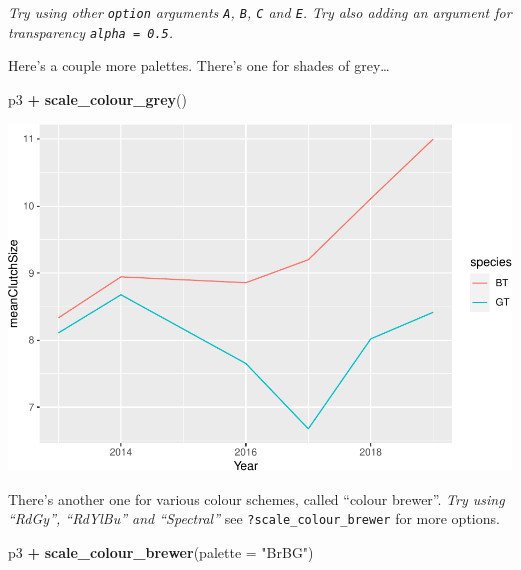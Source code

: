 \documentclass[
  a4paperpaper,
]{book}
\newenvironment{Shaded}{\begin{snugshade}}{\end{snugshade}}
\newcommand{\DataTypeTok}[1]{\textcolor[rgb]{0.13,0.29,0.53}{#1}}
\newcommand{\KeywordTok}[1]{\textcolor[rgb]{0.13,0.29,0.53}{\textbf{#1}}}
\newcommand{\NormalTok}[1]{#1}
\newcommand{\OperatorTok}[1]{\textcolor[rgb]{0.81,0.36,0.00}{\textbf{#1}}}
\newcommand{\StringTok}[1]{\textcolor[rgb]{0.31,0.60,0.02}{#1}}
\begin{document}
\emph{Try using other \texttt{option} arguments \texttt{A}, \texttt{B}, \texttt{C} and \texttt{E}. Try also adding an argument for transparency \texttt{alpha\ =\ 0.5}.}

Here's a couple more palettes. There's one for shades of grey\ldots{}

\begin{Shaded}
\begin{Highlighting}[]
\NormalTok{p3 }\OperatorTok{+}\StringTok{ }
\StringTok{  }\KeywordTok{scale\_colour\_grey}\NormalTok{()}
\end{Highlighting}
\end{Shaded}

\begin{center}\includegraphics{BB852_files/figure-latex/unnamed-chunk-120-1} \end{center}

There's another one for various colour schemes, called ``colour brewer''. \emph{Try using ``RdGy'', ``RdYlBu'' and ``Spectral''} see \texttt{?scale\_colour\_brewer} for more options.

\begin{Shaded}
\begin{Highlighting}[]
\NormalTok{p3 }\OperatorTok{+}\StringTok{ }
\StringTok{  }\KeywordTok{scale\_colour\_brewer}\NormalTok{(}\DataTypeTok{palette =} \StringTok{"BrBG"}\NormalTok{)}
\end{Highlighting}
\end{Shaded}
\end{document}
